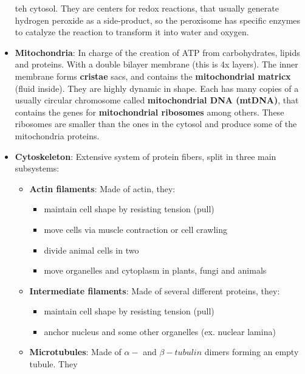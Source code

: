 \documentclass[a4paper,landscape,10pt]{cheatsheet}
\begin{document}
\begin{itemize}
            teh cytosol. They are centers for redox reactions, that usually generate hydrogen peroxide as a side-product, so
            the peroxisome has specific enzymes to catalyze the reaction to transform it into water and oxygen.
      \item \textbf{Mitochondria}: In charge of the creation of ATP from carbohydrates, lipids and proteins. With a double
            bilayer membrane (this is 4x layers). The inner membrane forms \textbf{cristae} sacs, and contains the
            \textbf{mitochondrial matricx} (fluid inside). They are highly dynamic in shape. Each has many copies of a
            usually circular chromosome called \textbf{mitochondrial DNA (mtDNA)}, that contains the genes for
            \textbf{mitochondrial ribosomes} among others. These ribosomes are smaller than the ones in the cytosol and
            produce some of the mitochondria proteins.
      \item \textbf{Cytoskeleton}: Extensive system of protein fibers, split in three main subsystems:
            \begin{itemize}
                  \item \textbf{Actin filaments}: Made of actin, they:
                        \begin{itemize}
                              \item maintain cell shape by resisting tension (pull)
                              \item move cells via muscle contraction or cell crawling
                              \item divide animal cells in two
                              \item move organelles and cytoplasm in plants, fungi and animals
                        \end{itemize}
                  \item \textbf{Intermediate filaments}: Made of several different proteins, they:
                        \begin{itemize}
                              \item maintain cell shape by resisting tension (pull)
                              \item anchor nucleus and some other organelles (ex. nuclear lamina)
                        \end{itemize}
                  \item \textbf{Microtubules}: Made of $\alpha-$ and $\beta-tubulin$ dimers forming an empty tubule. They

\end{itemize}
\end{itemize}
\end{document}
